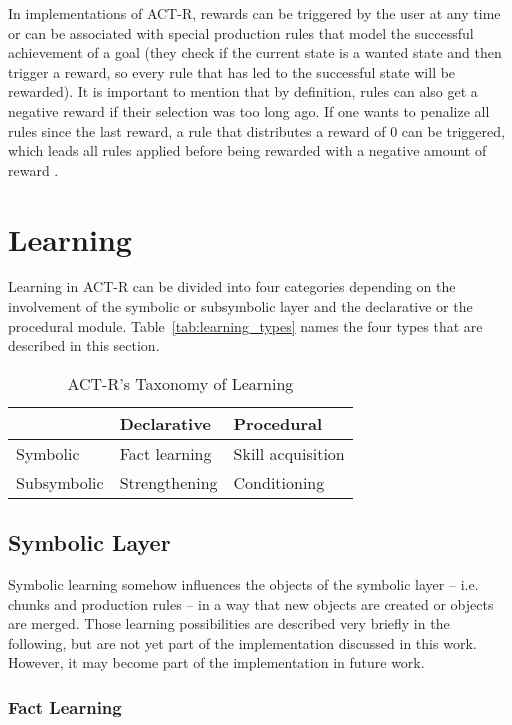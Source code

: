 In implementations of ACT-R, rewards can be triggered by the user at any time or can be associated with special production rules that model the successful achievement of a goal (they check if the current state is a wanted state and then trigger a reward, so every rule that has led to the successful state will be rewarded). It is important to mention that by definition, rules can also get a negative reward if their selection was too long ago. If one wants to penalize all rules since the last reward, a rule that distributes a reward of 0 can be triggered, which leads all rules applied before being rewarded with a negative amount of reward \cite[unit 6, p. 8]{actr_tutorial}.

\section{Learning}

Learning in ACT-R can be divided into four categories depending on the involvement of the symbolic or subsymbolic layer and the declarative or the procedural module. Table~\ref{tab:learning_types} names the four types that are described in this section.

\begin{table}[hbt]
\caption{ACT-R's Taxonomy of Learning \cite[92--95]{anderson_how_2007}}
\begin{center}
\begin{tabular}{|l|ll|}
\hline
 & Declarative & Procedural\\
\hline
Symbolic & Fact learning & Skill acquisition\\
Subsymbolic & Strengthening & Conditioning\\
\hline
\end{tabular}
\end{center}
\end{table}


\subsection{Symbolic Layer}

Symbolic learning somehow influences the objects of the symbolic layer -- i.e. chunks and production rules -- in a way that new objects are created or objects are merged. Those learning possibilities are described very briefly in the following, but are not yet part of the implementation discussed in this work. However, it may become part of the implementation in future work.

\subsubsection{Fact Learning}

